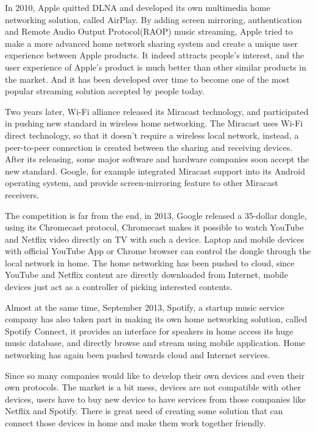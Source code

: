 In 2010, Apple quitted DLNA and developed its own multimedia home networking
solution, called AirPlay. By adding screen mirroring, authentication and Remote
Audio Output Protocol(RAOP) music streaming, Apple tried to make a more advanced
home network sharing system and create a unique user experience between Apple
products. It indeed attracts people's interest, and the user experience of
Apple's product is much better than other similar products in the market. And it
has been developed over time to become one of the most popular streaming
solution accepted by people today.

Two years later, Wi-Fi alliance released its Miracast technology, and
participated in pushing new standard in wireless home networking. The Miracast
uses Wi-Fi direct technology, so that it doesn't require a wireless local
network, instead, a peer-to-peer connection is created between the sharing and
receiving devices. After its releasing, some major software and hardware
companies soon accept the new standard. Google, for example integrated Miracast
support into its Android operating system, and provide screen-mirroring feature
to other Miracast receivers.

The competition is far from the end, in 2013, Google released a 35-dollar
dongle, using its Chromecast protocol, Chromecast makes it possible to watch
YouTube and Netflix video directly on TV with such a device. Laptop and mobile
devices with official YouTube App or Chrome browser can control the dongle
through the local network in home. The home networking has been pushed to
cloud, since YouTube and Netflix content are directly downloaded from Internet,
mobile devices just act as a controller of picking interested contents.

Almost at the same time, September 2013, Spotify, a startup music service
company has also taken part in making its own home networking solution, called
Spotify Connect, it provides an interface for speakers in home access its huge
music database, and directly browse and stream using mobile application. Home
networking has again been pushed towards cloud and Internet services.

Since so many companies would like to develop their own devices and even their
own protocols. The market is a bit mess, devices are not compatible with other
devices, users have to buy new device to have services from those companies
like Netflix and Spotify. There is great need of creating some solution that can
connect those devices in home and make them work together friendly.

